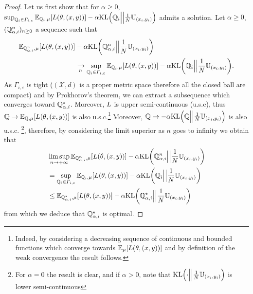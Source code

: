 \begin{proof}
Let us first show that for $\alpha\geq 0$, $\sup_{\QQ_i\in\Gamma_{i,\varepsilon}}\mathbb{E}_{\QQ_i,\mu}\left[\loss(\theta,(x,y))\right]-\alpha\text{KL}\left(\QQ_i\Big|\Big|\frac{1}{\numsamples}\mathbb{U}_{(x_i,y_i)}\right)$ admits a solution. Let $\alpha\geq 0$,
$(\mathbb{Q}_{\alpha,i}^{n})_{n\geq 0}$ a sequence such that
\begin{align*}
  \mathbb{E}_{\QQ_{\alpha,i}^{n},\mu}\left[\loss(\theta,(x,y))\right]&-\alpha\text{KL}\left(\QQ_{\alpha,i}^{n}\Big|\Big|\frac{1}{\numsamples}\mathbb{U}_{(x_i,y_i)}\right)\\
  &\xrightarrow[n]{} \sup_{\QQ_i\in\Gamma_{i,\varepsilon}}\mathbb{E}_{\QQ_i,\mu}\left[\loss(\theta,(x,y))\right]-\alpha\text{KL}\left(\QQ_i\Big|\Big|\frac{1}{\numsamples}\mathbb{U}_{(x_i,y_i)}\right).
\end{align*}
As $\Gamma_{i,\varepsilon}$ is tight ($(\mathcal{X},d)$ is a proper metric space therefore all the closed ball are compact) and by Prokhorov's theorem, we can extract a subsequence which converges  toward  $\mathbb{Q}^{\star}_{\alpha,i}$. Moreover, $L$ is upper semi-continuous (u.s.c), thus $\QQ\rightarrow \mathbb{E}_{\QQ,\mu}\left[\loss(\theta,(x,y))\right]$ is also u.s.c.\footnote{Indeed, by considering a decreasing sequence of continuous and bounded functions which converge towards $\mathbb{E}_{\mu}\left[\loss(\theta,(x,y))\right]$ and by definition of the weak convergence the result follows.} Moreover, 
$\QQ\rightarrow - \alpha \text{KL}\left(\QQ\Big|\Big|\frac{1}{\numsamples}\mathbb{U}_{(x_i,y_i)}\right)$ is also u.s.c. \footnote{For $\alpha=0$ the result is clear, and if $\alpha>0$, note that $\text{KL}\left(\cdot\Big|\Big|\frac{1}{\numsamples}\mathbb{U}_{(x_i,y_i)}\right)$ is lower semi-continuous}, therefore, by considering the limit superior as $n$ goes to infinity we obtain that
\begin{align*}
    &\limsup_{n\to+\infty}\mathbb{E}_{\QQ_{\alpha,i}^{n},\mu}\left[\loss(\theta,(x,y))\right]-\alpha\text{KL}\left(\QQ_{\alpha,i}^{n}\Big|\Big|\frac{1}{\numsamples}\mathbb{U}_{(x_i,y_i)}\right)\\
    &=\sup_{\QQ_i\in\Gamma_{i,\varepsilon}}\mathbb{E}_{\QQ_i,\mu}\left[\loss(\theta,(x,y))\right]-\alpha\text{KL}\left(\QQ_i\Big|\Big|\frac{1}{\numsamples}\mathbb{U}_{(x_i,y_i)}\right)\\
    &\leq \mathbb{E}_{\QQ_{\alpha,i}^{\star},\mu}\left[\loss(\theta,(x,y))\right]-\alpha\text{KL}\left(\QQ_{\alpha,i}^{\star}\Big|\Big|\frac{1}{\numsamples}\mathbb{U}_{(x_i,y_i)}\right)
\end{align*}
from which we deduce that $\mathbb{Q}_{\alpha,i}^{\star}$ is optimal.


\end{proof}
